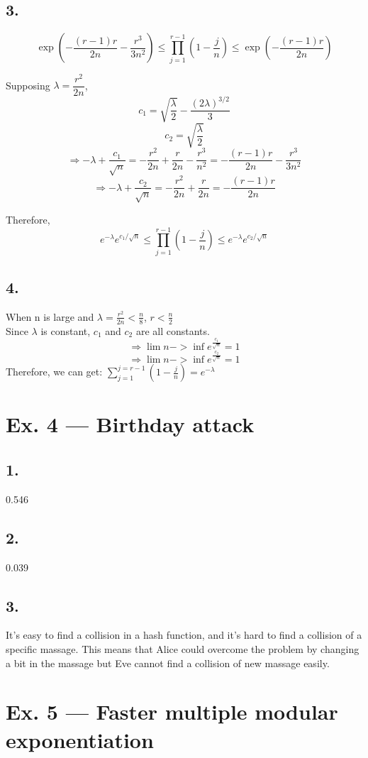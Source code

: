 \documentclass[a4paper,12pt]{journal}
\begin{document}
\subsection*{3.}
$$\exp\left(-\frac{(r-1)r}{2n}-\frac{r^3}{3n^2}\right) \leq \prod_{j=1}^{r-1} \left(1-\frac{j}{n}\right) \leq \exp\left(-\frac{(r-1)r}{2n}\right)$$

Supposing $\lambda=\dfrac{r^2}{2n}$, $$c_1=\sqrt{\dfrac{\lambda}{2}}-\dfrac{(2\lambda)^{3/2}}{3}$$ $$c_2=\sqrt{\dfrac{\lambda}{2}}$$
$$\Rightarrow-\lambda+\frac{c_1}{\sqrt{n}}=-\frac{r^2}{2n}+\frac{r}{2n}-\frac{r^3}{n^2}=-\frac{(r-1)r}{2n}-\frac{r^3}{3n^2}$$
$$\Rightarrow-\lambda+\frac{c_2}{\sqrt{n}}=-\frac{r^2}{2n}+\frac{r}{2n}=-\frac{(r-1)r}{2n}$$

Therefore,\\
$$e^{-\lambda}e^{c_1/\sqrt{n}} \leq \prod_{j=1}^{r-1} \left(1-\frac{j}{n}\right) \leq e^{-\lambda}e^{c_2/\sqrt{n}}$$
\subsection*{4.}
When n is large and $\lambda =\frac{r^2}{2n} <\frac{n}{8}$, $r<\frac{n}{2}$\\
Since $\lambda$ is constant, $c_1$ and $c_2$ are all constants.\\
$$\Rightarrow\lim n->\inf e^{\frac{c_1}{\sqrt{n}}}=1$$
$$\Rightarrow\lim n->\inf e^{\frac{c_2}{\sqrt{n}}}=1$$
Therefore, we can get: $\sum_{j=1}^{j=r-1}(1-\frac{j}{n})=e^{-\lambda}$ \\
\section*{Ex. 4 — Birthday attack}
\subsection*{1.}
0.546
\subsection*{2.}
0.039
\subsection*{3.}
It's easy to find a collision in a hash function, and it's  hard to find a collision of a specific massage. This means that Alice could overcome the problem by changing a bit in the massage but Eve cannot find a collision of new massage easily.\\
\section*{Ex. 5 — Faster multiple modular exponentiation}

 
\end{document}
